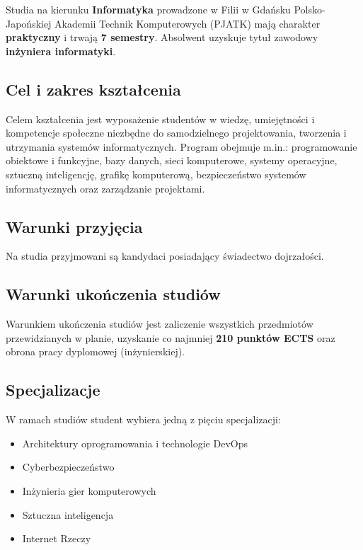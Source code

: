 \documentclass[12pt,a4paper]{article}
\begin{document}
\newpage

Studia na kierunku \textbf{Informatyka} prowadzone w Filii w Gdańsku Polsko-Japońskiej Akademii Technik Komputerowych (PJATK) mają charakter \textbf{praktyczny} i trwają \textbf{7 semestry}. Absolwent uzyskuje tytuł zawodowy \textbf{inżyniera informatyki}.

\subsection{Cel i zakres kształcenia}

Celem kształcenia jest wyposażenie studentów w wiedzę, umiejętności i kompetencje społeczne niezbędne do samodzielnego projektowania, tworzenia i utrzymania systemów informatycznych. Program obejmuje m.in.: programowanie obiektowe i funkcyjne, bazy danych, sieci komputerowe, systemy operacyjne, sztuczną inteligencję, grafikę komputerową, bezpieczeństwo systemów informatycznych oraz zarządzanie projektami.

\subsection{Warunki przyjęcia}

Na studia przyjmowani są kandydaci posiadający świadectwo dojrzałości.

\subsection{Warunki ukończenia studiów}

Warunkiem ukończenia studiów jest zaliczenie wszystkich przedmiotów przewidzianych w planie, uzyskanie co najmniej \textbf{210 punktów ECTS} oraz obrona pracy dyplomowej (inżynierskiej).

\subsection{Specjalizacje}

W ramach studiów student wybiera jedną z pięciu specjalizacji:
\begin{itemize}
  \item Architektury oprogramowania i technologie DevOps
  \item Cyberbezpieczeństwo
  \item Inżynieria gier komputerowych
  \item Sztuczna inteligencja
  \item Internet Rzeczy
\end{itemize}
\end{document}

